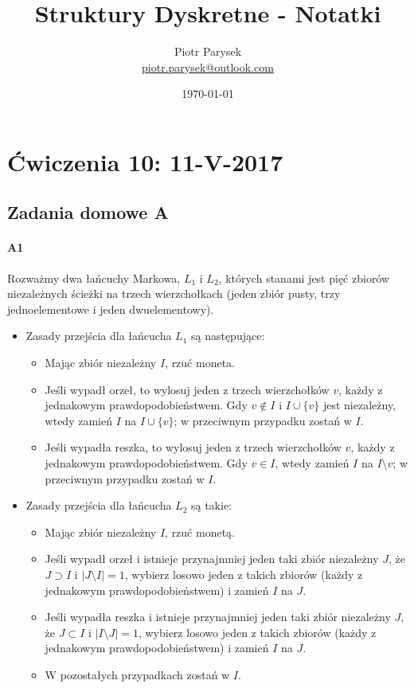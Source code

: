 \documentclass[a4paper,12pt]{article}
\title{Struktury Dyskretne - Notatki}
\author{Piotr Parysek\\
\href{mailto:piotr.parysek@outlook.com}{piotr.parysek@outlook.com} }
\date{\today}
\theoremstyle{definition}%
\theoremstyle{definition}
\theoremstyle{problem}
\begin{document}
\maketitle

\tableofcontents
\section{Ćwiczenia 10: 11-V-2017}
\subsection{Zadania domowe A}
\paragraph{A1} Rozważmy dwa łańcuchy Markowa, $L_1$ i $L_2$, których stanami jest pięć zbiorów niezależnych ścieżki na trzech wierzchołkach (jeden zbiór pusty, trzy jednoelementowe i jeden dwuelementowy).
\begin{itemize}
\item Zasady przejścia dla łańcucha $L_1$ są następujące:
\begin{itemize}
\item Mając zbiór niezależny $I$, rzuć moneta.
\item Jeśli wypadł orzeł, to wylosuj jeden z trzech wierzchołków $v$, każdy z jednakowym prawdopodobieństwem. Gdy $v \not \in I$ i $I \cup \{v\}$ jest niezależny, wtedy zamień $I$ na $I \cup \{v\}$; w przeciwnym przypadku zostań w $I$.
\item Jeśli wypadła reszka, to wylosuj jeden z trzech wierzchołków $v$, każdy z jednakowym prawdopodobieństwem. Gdy $v \in I$, wtedy zamień $I$ na $I \setminus v$; w przeciwnym przypadku zostań w $I$.
\end{itemize}
\item  Zasady przejścia dla łańcucha $L_2$ są takie:
\begin{itemize}
\item  Mając zbiór niezależny $I$, rzuć monetą.
\item Jeśli wypadł orzeł i istnieje przynajmniej jeden taki zbiór niezależny $J$, że $J \supset  I$ i $|J \setminus I| = 1$, wybierz losowo jeden z takich zbiorów (każdy z jednakowym prawdopodobieństwem) i zamień $I$ na $J$.
\item Jeśli wypadła reszka i istnieje przynajmniej jeden taki zbiór niezależny $J$, że $J \subset I$ i $|I \setminus J| = 1$, wybierz losowo jeden z takich zbiorów (każdy z jednakowym prawdopodobieństwem) i zamień $I$ na $J$.
\item W pozostałych przypadkach zostań w $I$.
\end{itemize}
\end{itemize}
\end{document}
